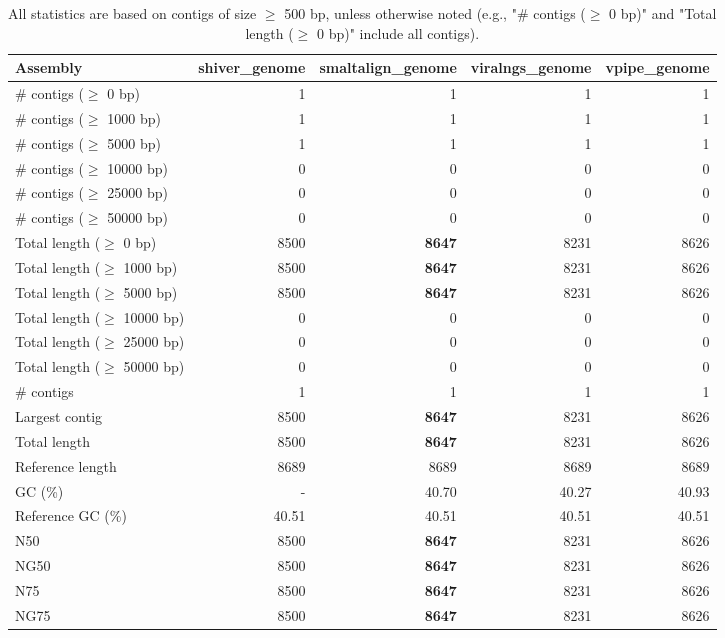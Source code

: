 \documentclass[12pt,a4paper]{article}
\begin{document}
\begin{table}[ht]
\begin{center}
\caption{All statistics are based on contigs of size $\geq$ 500 bp, unless otherwise noted (e.g., "\# contigs ($\geq$ 0 bp)" and "Total length ($\geq$ 0 bp)" include all contigs).}
\begin{tabular}{|l*{4}{|r}|}
\hline
Assembly & shiver\_genome & smaltalign\_genome & viralngs\_genome & vpipe\_genome \\ \hline
\# contigs ($\geq$ 0 bp) & 1 & 1 & 1 & 1 \\ \hline
\# contigs ($\geq$ 1000 bp) & 1 & 1 & 1 & 1 \\ \hline
\# contigs ($\geq$ 5000 bp) & 1 & 1 & 1 & 1 \\ \hline
\# contigs ($\geq$ 10000 bp) & 0 & 0 & 0 & 0 \\ \hline
\# contigs ($\geq$ 25000 bp) & 0 & 0 & 0 & 0 \\ \hline
\# contigs ($\geq$ 50000 bp) & 0 & 0 & 0 & 0 \\ \hline
Total length ($\geq$ 0 bp) & 8500 & {\bf 8647} & 8231 & 8626 \\ \hline
Total length ($\geq$ 1000 bp) & 8500 & {\bf 8647} & 8231 & 8626 \\ \hline
Total length ($\geq$ 5000 bp) & 8500 & {\bf 8647} & 8231 & 8626 \\ \hline
Total length ($\geq$ 10000 bp) & 0 & 0 & 0 & 0 \\ \hline
Total length ($\geq$ 25000 bp) & 0 & 0 & 0 & 0 \\ \hline
Total length ($\geq$ 50000 bp) & 0 & 0 & 0 & 0 \\ \hline
\# contigs & 1 & 1 & 1 & 1 \\ \hline
Largest contig & 8500 & {\bf 8647} & 8231 & 8626 \\ \hline
Total length & 8500 & {\bf 8647} & 8231 & 8626 \\ \hline
Reference length & 8689 & 8689 & 8689 & 8689 \\ \hline
GC (\%) & - & 40.70 & 40.27 & 40.93 \\ \hline
Reference GC (\%) & 40.51 & 40.51 & 40.51 & 40.51 \\ \hline
N50 & 8500 & {\bf 8647} & 8231 & 8626 \\ \hline
NG50 & 8500 & {\bf 8647} & 8231 & 8626 \\ \hline
N75 & 8500 & {\bf 8647} & 8231 & 8626 \\ \hline
NG75 & 8500 & {\bf 8647} & 8231 & 8626 \\ \hline

\end{tabular}
\end{center}
\end{table}
\end{document}
